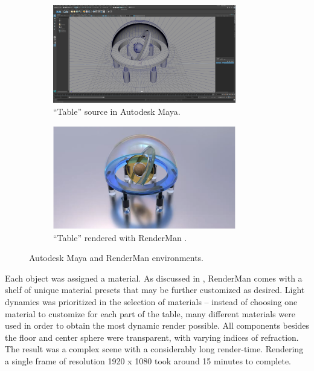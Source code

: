 \documentclass[conference]{IEEEtran}
\begin{document}
\begin{figure}[h!]
\centering
\begin{subfigure}{.5\textwidth}
\begin{center}
\begin{minipage}[t]{\linewidth}
\centerline{\includegraphics[width=8cm]{project1.png}}
\caption{``Table'' source in Autodesk Maya.}
\label{fig:environment}
\end{minipage}
\end{center}
\end{subfigure}
\par\bigskip
\begin{subfigure}{.5\textwidth}
\begin{center}
\begin{minipage}[t]{\linewidth}
\centerline{\includegraphics[width=8cm]{table.png}}
\caption{``Table'' rendered with RenderMan \cite{animation}.}
\label{fig:table}
\end{minipage}
\end{center}
\end{subfigure}
\caption{Autodesk Maya and RenderMan environments.}
\label{fig:table_pair}
\end{figure}

Each object was assigned a material.
As discussed in \cite{renderman},
RenderMan comes with a shelf of unique material presets that may be further customized as desired.
Light dynamics was prioritized in the selection of materials --
instead of choosing one material to customize for each part of the table,
many different materials were used in order to obtain the most dynamic render possible.
All components besides the floor and center sphere were transparent, with varying indices of refraction.
The result was a complex scene with a considerably long render-time.
Rendering a single frame of resolution 1920 x 1080 took around 15 minutes to complete.
\end{document}
